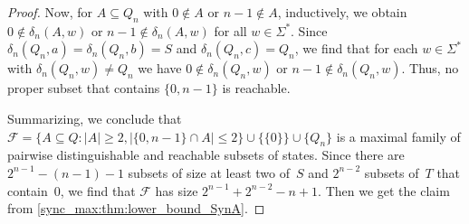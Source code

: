 \begin{proof}
	Now, for $A \subseteq Q_n$ with $0 \notin A$
	or $n - 1 \notin A$, inductively,
	we obtain $0 \notin \delta_n(A, w)$
	or $n - 1 \notin \delta_n(A, w)$ for all $w \in \Sigma^*$.
	Since $\delta_n(Q_n, a) = \delta_n(Q_n, b) = S$
	and $\delta_n(Q_n, c) = Q_n$,
	we find that for each $w \in \Sigma^*$
	with $\delta_n(Q_n, w) \ne Q_n$
	we have $0 \notin \delta_n(Q_n, w)$
	or $n - 1 \notin \delta_n(Q_n, w)$.
	Thus, no proper subset that contains $\{0,n-1\}$
	is reachable.
			
	Summarizing, we conclude that
	$\mathcal F = \{ A \subseteq Q : |A| \ge 2, |\{0,n-1\} \cap A| \le 2 \} \cup \{ \{0\} \} \cup \{Q_n\}$
	is a maximal family of pairwise distinguishable
	and reachable subsets of states.
	Since there are $2^{n - 1} - (n - 1) - 1$ subsets of size at least two
	of~$S$ and $2^{n - 2}$ subsets of~$T$
	that contain~$0$, we find that $\mathcal F$
	has size $2^{n-1} + 2^{n-2} - n + 1$.
	Then we get the claim from \cref{sync_max:thm:lower_bound_SynA}.
\end{proof}

